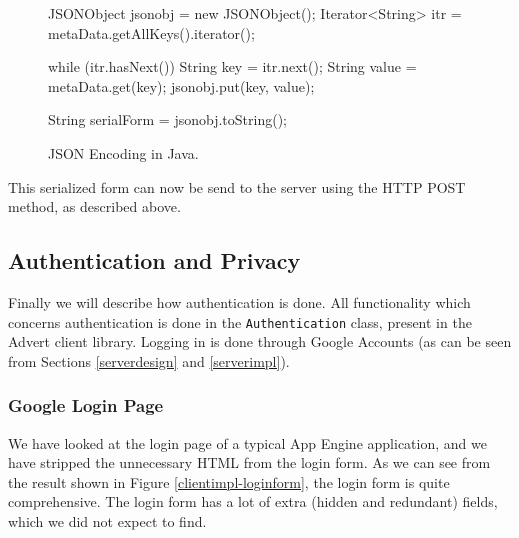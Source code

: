 \begin{figure*}[ht] %
\begin{center}
\begin{code}
JSONObject    jsonobj = new JSONObject();
Iterator<String> itr  = metaData.getAllKeys().iterator();

while (itr.hasNext()) {
	String key   = itr.next();
	String value = metaData.get(key);
	jsonobj.put(key, value);
}

String serialForm = jsonobj.toString();
\end{code}
\caption{JSON Encoding in Java.\label{clientimpl-json}}
\end{center}
\end{figure*}

This serialized form can now be send to the server using the HTTP POST method,
as described above.

\subsection{Authentication and Privacy}
\label{clientimpl-auth}
Finally we will describe how authentication is done. All functionality which
concerns authentication is done in the \texttt{Authentication} class, present
in the Advert client library. Logging in is done through Google Accounts (as
can be seen from Sections \ref{serverdesign} and \ref{serverimpl}).

\subsubsection{Google Login Page}
We have looked at the login page of a typical App Engine application, and we
have stripped the unnecessary HTML from the login form. As we can see from the
result shown in Figure \ref{clientimpl-loginform}, the login form is quite
comprehensive. The login form has a lot of extra (hidden and redundant) fields,
which we did not expect to find.

